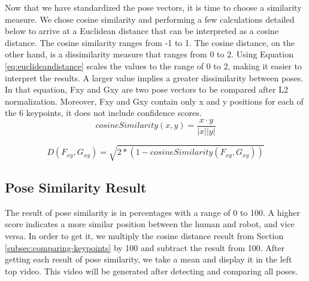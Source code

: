 Now that we have standardized the pose vectors, it is time to choose a similarity measure. We chose cosine similarity and performing a few calculations detailed below to arrive at a Euclidean distance that can be interpreted as a cosine distance.
The cosine similarity ranges from -1 to 1. The cosine distance, on the other hand, is a dissimilarity measure that ranges from 0 to 2.
Using Equation \ref{eq:euclideandistance} scales the values to the range of 0 to 2, making it easier to interpret the results. A larger value implies a greater dissimilarity between poses. In that equation, Fxy and Gxy are two pose vectors to be compared after L2 normalization. Moreover, Fxy and Gxy contain only x and y positions for each of the 6 keypoints, it does not include confidence scores.
\begin{equation} 
  \label{eq:cosinesimilarity}
  cosineSimilarity(x,y) = \frac{x \cdot y}{|x||y|}
\end{equation}

\begin{equation}
  \label{eq:euclideandistance}
  D(F_{xy}, G_{xy}) = \sqrt{2 * (1 - cosineSimilarity(F_{xy}, G_{xy}))}
\end{equation}


\subsection{Pose Similarity Result}
\label{subsec:pose-similarity-result}

The result of pose similarity is in percentages with a range of 0 to 100. A higher score indicates a more similar position between the human and robot, and vice versa.
In order to get it, we multiply the cosine distance result from Section \ref{subsec:comparing-keypoints} by 100 and subtract the result from 100.
After getting each result of pose similarity, we take a mean and display it in the left top video. This video will be generated after detecting and comparing all poses.